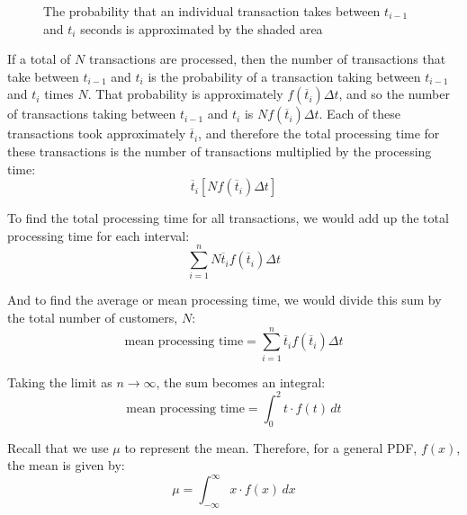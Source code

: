 \begin{figure}[H]
    \centering
    \label{fig:mean}
    \caption{The probability that an individual transaction takes between 
    $t_{i-1}$ and $t_i$ seconds is approximated by the shaded area}
\end{figure}

If a total of $N$ transactions are processed, then the number of transactions 
that take between $t_{i-1}$ and $t_i$ is the probability of a transaction 
taking between $t_{i-1}$ and $t_i$ times $N$. That probability is approximately $f(\overline{t}_i) \Delta t$, and so the number of transactions taking between 
$t_{i-1}$ and $t_i$ is $Nf(\overline{t}_i) \Delta t$. Each of these 
transactions took approximately $\overline{t}_i$, and therefore the total 
processing time for these transactions is the number of transactions multiplied
by the processing time:
$$\overline{t}_i \left[ N f(\overline{t}_i) \Delta t \right]$$

To find the total processing time for all transactions, we would add up the 
total processing time for each interval:
$$\sum_{i = 1}^n N \overline{t}_i f(\overline{t}_i) \Delta t$$

And to find the average or mean processing time, we would divide this sum by 
the total number of customers, $N$:
$$\text{mean processing time} = \sum_{i = 1}^n \overline{t}_i f(\overline{
t}_i) \Delta t$$

Taking the limit as $n \to \infty$, the sum becomes an integral:
$$\text{mean processing time} = \int_0^2 t \cdot f(t)\,dt$$

Recall that we use $\mu$ to represent the mean. Therefore, for a general PDF, 
$f(x)$, the mean is given by:
$$\mu = \int_{-\infty}^{\infty} x \cdot f(x)\,dx$$

